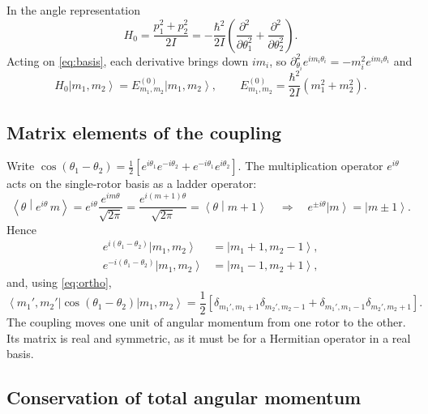 \documentclass[preprint,12pt]{elsarticle}
\newcommand{\ket}[1]{\left|#1\right\rangle}
\newcommand{\bra}[1]{\left\langle#1\right|}
\newcommand{\braket}[2]{\left\langle#1\middle|#2\right\rangle}
\begin{document}
In the angle representation
\begin{equation}
H_{0}=\frac{p_{1}^{2}+p_{2}^{2}}{2I}
=-\frac{\hbar^{2}}{2I}\left(\frac{\partial^{2}}{\partial\theta_{1}^{2}}
+\frac{\partial^{2}}{\partial\theta_{2}^{2}}\right).
\end{equation}
Acting on \eqref{eq:basis}, each derivative brings down $im_{i}$, so
$\partial^{2}_{\theta_{i}}e^{im_{i}\theta_{i}}=-m_{i}^{2}e^{im_{i}\theta_{i}}$ and
\begin{equation}
H_{0}\ket{m_{1},m_{2}}=E^{(0)}_{m_{1},m_{2}}\ket{m_{1},m_{2}},\qquad
E^{(0)}_{m_{1},m_{2}}=\frac{\hbar^{2}}{2I}\left(m_{1}^{2}+m_{2}^{2}\right).
\label{eq:E0}
\end{equation}

\subsection{Matrix elements of the coupling}

Write $\cos(\theta_{1}-\theta_{2})=\tfrac12\left[e^{i\theta_{1}}e^{-i\theta_{2}}
+e^{-i\theta_{1}}e^{i\theta_{2}}\right]$. The multiplication operator
$e^{i\theta}$ acts on the single-rotor basis as a ladder operator:
\begin{equation}
\braket{\theta}{e^{i\theta}\,m}=e^{i\theta}\frac{e^{im\theta}}{\sqrt{2\pi}}
=\frac{e^{i(m+1)\theta}}{\sqrt{2\pi}}=\braket{\theta}{m+1}
\quad\Longrightarrow\quad
e^{\pm i\theta}\ket{m}=\ket{m\pm1}.
\label{eq:ladder}
\end{equation}
Hence
\begin{align}
e^{i(\theta_{1}-\theta_{2})}\ket{m_{1},m_{2}}&=\ket{m_{1}+1,m_{2}-1},\\
e^{-i(\theta_{1}-\theta_{2})}\ket{m_{1},m_{2}}&=\ket{m_{1}-1,m_{2}+1},
\end{align}
and, using \eqref{eq:ortho},
\begin{equation}
\bra{m_{1}',m_{2}'}\cos(\theta_{1}-\theta_{2})\ket{m_{1},m_{2}}
=\frac12\left[\delta_{m_{1}',m_{1}+1}\delta_{m_{2}',m_{2}-1}
+\delta_{m_{1}',m_{1}-1}\delta_{m_{2}',m_{2}+1}\right].
\label{eq:V}
\end{equation}
The coupling moves one unit of angular momentum from one rotor to the other.
Its matrix is real and symmetric, as it must be for a Hermitian operator in a
real basis.

\subsection{Conservation of total angular momentum}
\end{document}
